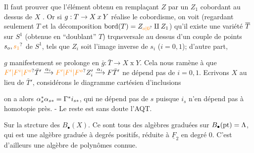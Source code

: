 Il faut prouver que l'élément obtenu en remplaçant $Z$ par un $Z_1$ cobordant au dessus de $X$ . Or si $g:T\to X\mathbin{x}Y$ réalise le cobordisme, on voit (regardant seulement $T$ et la décomposition $\mathrm{bord}(T)=Z_{\unsure{o|0}}\handwritten{\amalg}Z_1$) qu'il existe une variété $\overline{T}$ sur $S^1$ (obtenue en ``doublant'' $T$)  trqnsversale au dessus d'un couple de points $s_o,\unsure{s_1}$ de $S^1$, tels que $Z_i$ soit l'image inverse  de $s_i$ ($i=0,1$); d'autre part,


$g$ manifestement se prolonge en $\bar{g}:\bar{T}\longrightarrow X\mathbin{x}Y$. Cela nous ramène à  que  $\handwritten{\unsure{F'|F^i|F^o}}\bar T'\xrightarrow{\handwritten{\alpha_i}} \handwritten{\unsure{F'|F^i|F^o}}Z'_i\xrightarrow{\handwritten{\alpha_i}}\handwritten{F}\bar T'$ ne dépend pas de $i=0,1$. Ecrivons $X$ au lieu de $\bar T'$,  considérons le diagramme cartésien d'inclusions


on a alors $\alpha{}_{s}^{*}\alpha{}_{s*}=\Gamma^{*}i_{s*}$, qui ne dépend pas de $s$ puisque $i_s$ n'en dépend pas à homotopie près. - Le reste est sans doute l'AQT.

Sur la strcture des $B_{\bullet}(X)$. Ce sont tous des algèbres graduées sur $B_{\bullet}(\mathrm{pt})=\Lambda$, qui est une algèbre graduée à degrés positifs, réduite à $\underline{F}_2$ en degré $0$. C'est d'ailleurs une algèbre de polynômes connue.

